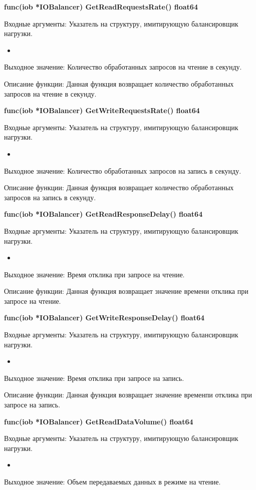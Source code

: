 \textbf{func(iob *IOBalancer) GetReadRequestsRate() float64}

Входные аргументы: Указатель на структуру, имитирующую балансировщик нагрузки.
\begin{itemize}
	\item 
\end{itemize}

Выходное значение: Количество обработанных запросов на чтение в секунду.

Описание функции: Данная функция возвращает количество обработанных запросов на чтение в секунду.

\textbf{func(iob *IOBalancer) GetWriteRequestsRate() float64}

Входные аргументы: Указатель на структуру, имитирующую балансировщик нагрузки.
\begin{itemize}
	\item 
\end{itemize}
Выходное значение: Количество обработанных запросов на запись в секунду. 

Описание функции: Данная функция возвращает количество обработанных запросов на запись в секунду.

\textbf{func(iob *IOBalancer) GetReadResponseDelay() float64}

Входные аргументы: Указатель на структуру, имитирующую балансировщик нагрузки.
\begin{itemize}
	\item 
\end{itemize}
Выходное значение: Время отклика при запросе на чтение. 

Описание функции: Данная функция возвращает значение времени отклика при запросе на чтение.

\textbf{func(iob *IOBalancer) GetWriteResponseDelay() float64}

Входные аргументы: Указатель на структуру, имитирующую балансировщик нагрузки.
\begin{itemize}
	\item 
\end{itemize}
Выходное значение: Время отклика при запросе на запись.

Описание функции: Данная функция возвращает значение временпи отклика при запросе на запись.

\textbf{func(iob *IOBalancer) GetReadDataVolume() float64}

Входные аргументы: Указатель на структуру, имитирующую балансировщик нагрузки.
\begin{itemize}
	\item 
\end{itemize}
Выходное значение: Объем передаваемых данных в режиме на чтение.

